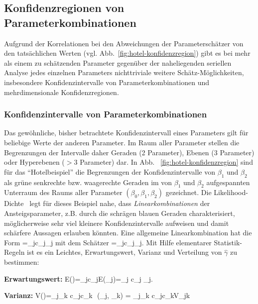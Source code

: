 

\subsection{\label{sec:KI-multi}Konfidenzregionen von
Parameterkombinationen} 
Aufgrund der Korrelationen bei den Abweichungen der
Parametersch\"atzer von den tat\-s\"ach\-lichen Werten
(vgl. Abb.~\ref{fig:hotel-konfidenzregion}) gibt es bei mehr als einem
zu sch\"atzenden Parameter gegen\"uber der naheliegenden seriellen
Analyse jedes einzelnen Parameters nichttriviale weitere
Sch\"atz-M\"oglichkeiten, insbesondere Konfidenzintervalle von
Parameterkombinationen und mehrdimensionale Konfidenzregionen.

\subsubsection{Konfidenzintervalle von Parameterkombinationen}

Das gew\"ohnliche, bisher betrachtete Konfidenzintervall eines
Parameters gilt f\"ur beliebige Werte der anderen Parameter. Im Raum
aller Parameter stellen die Begrenzungen der Intervalle daher Geraden
(2 Parameter), Ebenen (3 Parameter) oder Hyperebenen ($>3$ Parameter)
dar. In Abb. ~\ref{fig:hotel-konfidenzregion} sind f\"ur das
``Hotelbeispiel'' die
Begrenzungen der Konfidenzintervalle von $\beta_1$ und $\beta_2$
als gr\"une senkrechte bzw. waagerechte Geraden im von $\beta_1$ und
$\beta_2$ aufgespannten Unterraum des Raums aller Parameter 
$(\beta_0,\beta_1,\beta_2)$ gezeichnet. Die
Likelihood-Dichte~ legt f\"ur dieses Beispiel nahe,
dass \emph{Linearkombinationen} der Ansteigsparameter, z.B. durch die
schr\"agen blauen Geraden charakterisiert,  m\"oglicherweise
sehr viel kleinere Konfidenzintervalle aufweisen und damit sch\"arfere
Aussagen erlauben k\"onnten. 
Eine allgemeine Linearkombination hat die Form
\be
\gamma=\sum_jc_j\beta_j
\ee
mit dem Sch\"atzer
\be
\hat{\gamma}=\sum_jc_j\hatbeta_j.
\ee
%
Mit Hilfe elementarer Statistik-Regeln ist es ein Leichtes,
Erwartungswert, Varianz und Verteilung von $\hat{\gamma}$ zu bestimmen:
\bi
\item \textbf{Erwartungswert:}
\bdm
E(\hat{\gamma})=\sum_jc_jE(\hatbeta_j)=\sum_j c_j \beta_j.
\edm

\item \textbf{Varianz:}
\be
\label{vargamma}
V(\hat{\gamma})=\sum_j\sum_k c_jc_k\,\, (\hatbeta_j, \hatbeta_k)
 = \sum_j\sum_k c_jc_kV_{jk}
\ee

